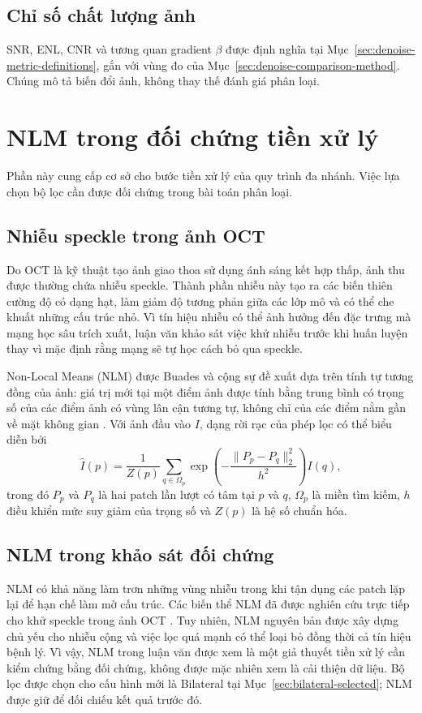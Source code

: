 \subsection{Chỉ số chất lượng ảnh}
SNR, ENL, CNR và tương quan gradient $\beta$ được định nghĩa tại
Mục~\ref{sec:denoise-metric-definitions}, gắn với vùng đo của Mục~\ref{sec:denoise-comparison-method}.
Chúng mô tả biến đổi ảnh, không thay thế đánh giá phân loại.

\section{NLM trong đối chứng tiền xử lý}
Phần này cung cấp cơ sở cho bước tiền xử lý của quy trình đa nhánh.
Việc lựa chọn bộ lọc cần được đối chứng trong bài toán phân loại.

\subsection{Nhiễu speckle trong ảnh OCT}
Do OCT là kỹ thuật tạo ảnh giao thoa sử dụng ánh sáng kết hợp thấp, ảnh thu được
thường chứa nhiễu speckle. Thành phần nhiễu này tạo ra các biến thiên cường độ có
dạng hạt, làm giảm độ tương phản giữa các lớp mô và có thể che khuất những cấu
trúc nhỏ. Vì tín hiệu nhiễu có thể ảnh hưởng đến đặc trưng mà mạng học sâu trích
xuất, luận văn khảo sát việc khử nhiễu trước khi huấn luyện thay vì mặc định rằng
mạng sẽ tự học cách bỏ qua speckle.

Non-Local Means (NLM) được Buades và cộng sự đề xuất dựa trên tính tự tương đồng
của ảnh: giá trị mới tại một điểm ảnh được tính bằng trung bình có trọng số của
các điểm ảnh có vùng lân cận tương tự, không chỉ của các điểm nằm gần về mặt
không gian \cite{buades2005}. Với ảnh đầu vào $I$, dạng rời rạc của phép lọc có
thể biểu diễn bởi
\begin{equation}
  \widehat{I}(p)=\frac{1}{Z(p)}
  \sum_{q\in\Omega_p}
  \exp\!\left(-\frac{\lVert P_p-P_q\rVert_2^2}{h^2}\right)I(q),
  \label{eq:nlm}
\end{equation}
trong đó $P_p$ và $P_q$ là hai patch lần lượt có tâm tại $p$ và $q$,
$\Omega_p$ là miền tìm kiếm, $h$ điều khiển mức suy giảm của trọng số và $Z(p)$
là hệ số chuẩn hóa.

\subsection{NLM trong khảo sát đối chứng}
NLM có khả năng làm trơn những vùng nhiễu trong khi tận dụng các patch lặp lại
để hạn chế làm mờ cấu trúc. Các biến thể NLM đã được nghiên cứu trực tiếp cho
khử speckle trong ảnh OCT \cite{aum2015}. Tuy nhiên, NLM nguyên bản được xây
dựng chủ yếu cho nhiễu cộng và việc lọc quá mạnh có thể loại bỏ đồng thời cả
tín hiệu bệnh lý. Vì vậy, NLM trong luận văn được xem là một giả thuyết tiền xử
lý cần kiểm chứng bằng đối chứng, không được mặc nhiên xem là cải thiện dữ liệu.
Bộ lọc được chọn cho cấu hình mới là Bilateral tại
Mục~\ref{sec:bilateral-selected}; NLM được giữ để đối chiếu kết quả trước đó.

